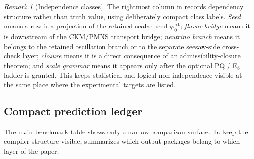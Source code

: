\documentclass[11pt,a4paper]{article}
\theoremstyle{definition}
\theoremstyle{remark}
\newtheorem*{remark}{Remark}
\newcommand{\phiz}{\varphi_0^{\mathrm{ret}}}
\begin{document}
\begin{table}[t]
{\begin{tabular}
\bottomrule
\end{tabular}}
\caption{Operational prediction set with explicit status and dependency classes.}
\label{tab:operational-prediction-set}
\end{table}

\begin{remark}[Independence classes]
The rightmost column in  records dependency structure rather than truth value, using deliberately compact class labels. \emph{Seed} means a row is a projection of the retained scalar seed $\phiz$; \emph{flavor bridge} means it is downstream of the CKM/PMNS transport bridge; \emph{neutrino branch} means it belongs to the retained oscillation branch or to the separate seesaw-side cross-check layer; \emph{closure} means it is a direct consequence of an admissibility-closure theorem; and \emph{scale grammar} means it appears only after the optional PQ / E$_8$ ladder is granted. This keeps statistical and logical non-independence visible at the same place where the experimental targets are listed.
\end{remark}

\subsection{Compact prediction ledger}

The main benchmark table shows only a narrow comparison surface. To keep the compiler structure visible,  summarizes which output packages belong to which layer of the paper.
\end{document}
